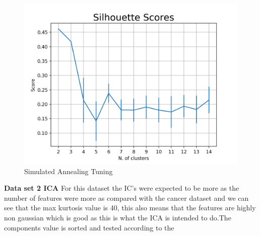 \documentclass[a4paper,12pt]{article}
\begin{document}
\begin{figure}[!htb]
\begin{minipage}{0.33\textwidth}
     \includegraphics[width=.95\linewidth]{em_ica_dataset1_sil}
   \end{minipage}\hfill
 \caption { Simulated Annealing Tuning}
\end{figure}
\textbf{ Data set 2 ICA} For this dataset the IC's were expected to be more as the number of features were more as compared with the cancer dataset and we can see that the max kurtosis value is 40, this also means that the features are highly non gaussian which is good as this is what the ICA is intended to do.The components value is sorted and tested according to the 
\end{document}
